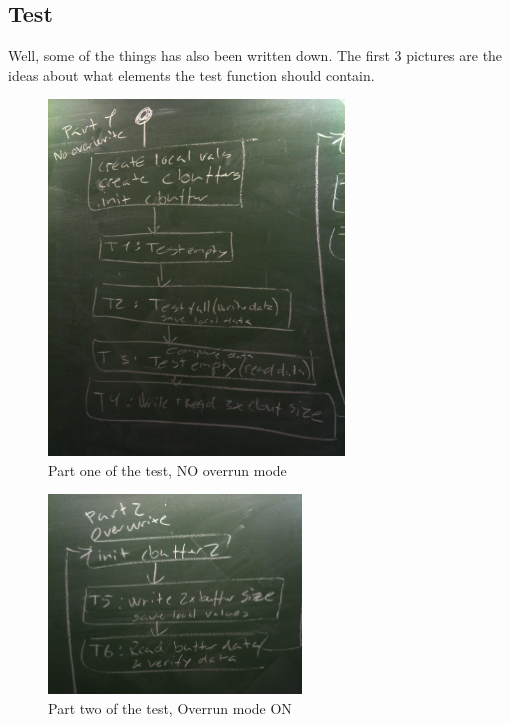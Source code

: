 \subsection{Test}
Well, some of the things has also been written down.
The first 3 pictures are the ideas about what elements the test function should contain.
\begin{figure}[th!]		%
 	\begin{centering}
 		\includegraphics[width=0.7\textwidth]{part1.jpg}
		\caption{Part one of the test, NO overrun mode}
	\end{centering}
\end{figure}
\newpage
\begin{figure}[th!]		%
	\begin{centering}
 		\includegraphics[width=0.6\textwidth]{part2.jpg}
		\caption{Part two of the test, Overrun mode ON}
	\end{centering}
\end{figure}


